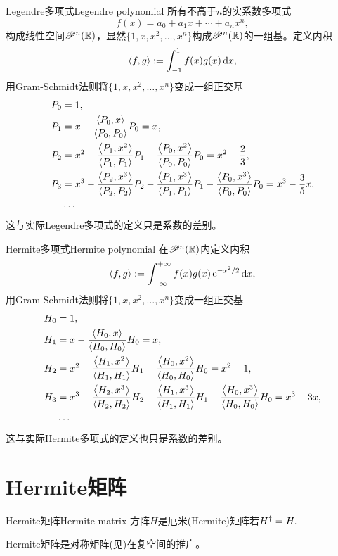 \begin{example}{Legendre多项式}{Legendre polynomial}
	所有不高于$n$的实系数多项式
	\[
		f(x)=a_0+a_1x+\cdots+a_nx^n,
	\]
	构成线性空间$\mathscr P^n(\mathbb R)$，显然$\{1,x,x^2,\ldots,x^n\}$构成$\mathscr P^n(\mathbb R)$的一组基。定义内积
	\[
		\left\langle f,g\right\rangle:=\int_{-1}^1f(x)g(x)\mathop{}\!\mathrm{d} x,
	\]
	用Gram-Schmidt法则将$\{1,x,x^2,\ldots,x^n\}$变成一组正交基%
	\begin{align*}
		P_0&=1,\\
		P_1&=x-\frac{\left\langle P_0,x\right\rangle}{\left\langle P_0,P_0\right\rangle}P_0=x,\\
		P_2&=x^2-\frac{\left\langle P_1,x^2\right\rangle}{\left\langle P_1,P_1\right\rangle}P_1-\frac{\left\langle P_0,x^2\right\rangle}{\left\langle P_0,P_0\right\rangle}P_0=x^2-\frac23,\\
		P_3&=x^3-\frac{\left\langle P_2,x^3\right\rangle}{\left\langle P_2,P_2\right\rangle}P_2-\frac{\left\langle P_1,x^3\right\rangle}{\left\langle P_1,P_1\right\rangle}P_1-\frac{\left\langle P_0,x^3\right\rangle}{\left\langle P_0,P_0\right\rangle}P_0=x^3-\frac35x,\\
		&\cdots
	\end{align*}
	这与实际Legendre多项式的定义只是系数的差别。
\end{example}
\begin{example}{Hermite多项式}{Hermite polynomial}
	在$\mathscr P^n(\mathbb R)$内定义内积
	\[
		\left\langle f,g\right\rangle:=\int_{-\infty}^{+\infty} f(x)g(x)\mathop{}\!\mathrm{e}^{-x^2/2}\mathop{}\!\mathrm{d} x,
	\]
	用Gram-Schmidt法则将$\{1,x,x^2,\ldots,x^n\}$变成一组正交基
	\begin{align*}
		H_0&=1,\\
		H_1&=x-\frac{\left\langle H_0,x\right\rangle}{\left\langle H_0,H_0\right\rangle}H_0=x,\\
		H_2&=x^2-\frac{\left\langle H_1,x^2\right\rangle}{\left\langle H_1,H_1\right\rangle}H_1-\frac{\left\langle H_0,x^2\right\rangle}{\left\langle H_0,H_0\right\rangle}H_0=x^2-1,\\
		H_3&=x^3-\frac{\left\langle H_2,x^3\right\rangle}{\left\langle H_2,H_2\right\rangle}H_2-\frac{\left\langle H_1,x^3\right\rangle}{\left\langle H_1,H_1\right\rangle}H_1-\frac{\left\langle H_0,x^3\right\rangle}{\left\langle H_0,H_0\right\rangle}H_0=x^3-3x,\\
		&\cdots
	\end{align*}
	这与实际Hermite多项式的定义也只是系数的差别。
\end{example}
\section{Hermite矩阵}
\begin{definition}{Hermite矩阵}{Hermite matrix}
	方阵$H$是厄米(Hermite)矩阵若$H^\dagger=H.$
\end{definition}
Hermite矩阵是对称矩阵(见)在复空间的推广。

